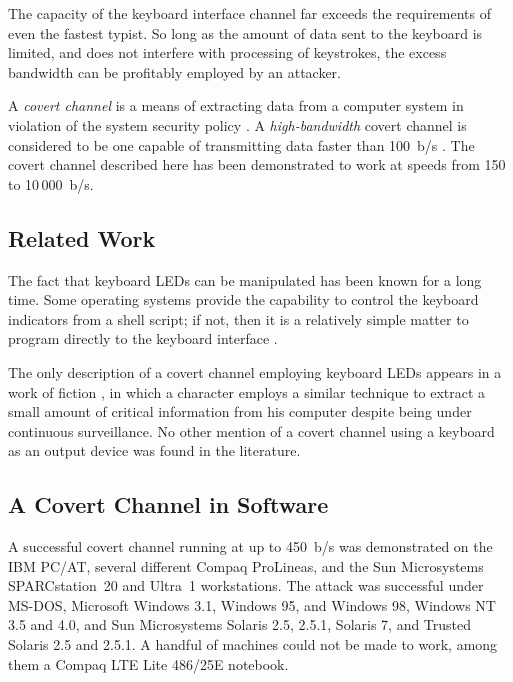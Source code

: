 \documentclass{acmtrans2e}
\begin{document}
The capacity of the keyboard interface channel far exceeds the 
requirements of even the fastest typist.  So long as the amount of data 
sent to the keyboard is limited, and does not interfere with processing 
of keystrokes, the excess bandwidth can be profitably employed by an 
attacker.

A {\it covert channel} is a means of extracting data from a computer 
system in violation of the system security policy
\cite{lampson,ncsc_covert_channels_book}.  A 
{\it high-bandwidth} covert channel is considered to be one capable of 
transmitting data faster than 100~b/s
\cite{common_criteria,orange_book}.  The covert channel described here
has been demonstrated to work at speeds from 150 to 10\,000~b/s.

\subsection{Related Work}

The fact that keyboard LEDs can be manipulated has been known for a long
time.  Some operating systems provide
the capability to control the keyboard indicators from a shell script; if 
not, then it is a relatively simple matter to program directly to the 
keyboard interface \cite{van_gilluwe}.

The only description of a covert channel employing keyboard LEDs 
appears in a work of fiction \cite{cryptonomicon}, in which a character
employs a similar 
technique to extract a small amount of critical information from his 
computer despite being under continuous surveillance.
No other mention of a covert channel using a
keyboard as an output device was found in the literature.

\subsection{A Covert Channel in Software }

A successful covert channel running at up to 450~b/s was
demonstrated on the IBM PC/AT, several different Compaq ProLineas, and
the Sun Microsystems SPARCstation~20 and 
Ultra~1 workstations.  The attack was successful under MS-DOS, Microsoft 
Windows 3.1, Windows 95, and Windows 98, Windows NT 3.5 and 4.0, and Sun
Microsystems Solaris 2.5, 2.5.1, Solaris 7, and Trusted Solaris 2.5
and 2.5.1.
A handful of machines could not be made to work, among them a Compaq
LTE Lite 486/25E notebook.
\end{document}
